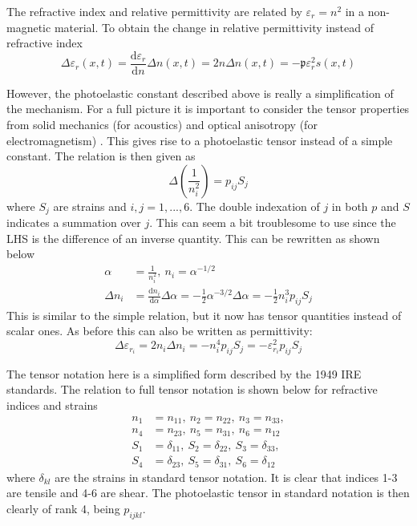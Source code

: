 \documentclass[10pt,a4paper]{eitExjobb}
\begin{document}
	The refractive index and relative permittivity are related by $\varepsilon_r = n^2$ in a non-magnetic material. To obtain the change in relative permittivity instead of refractive index
	\begin{equation*}
	\Delta \varepsilon_r(x,t) = \frac{\mathrm{d}\varepsilon_r}{\mathrm{d}n} \Delta n(x,t) = 2n \Delta n(x,t) = -\mathfrak{p} \varepsilon_r^2 s(x,t)
	\end{equation*}
	
	However, the photoelastic constant described above is really a simplification of the mechanism. For a full picture it is important to consider the tensor properties from solid mechanics (for acoustics) and optical anisotropy (for electromagnetism) \cite{Korpel1988}. This gives rise to a photoelastic tensor instead of a simple constant. The relation is then given as \cite{Korpel1988}
	\begin{equation*}
	\Delta \left( \frac{1}{n_i^2} \right) = p_{ij} S_j
	\end{equation*}
	where $S_j$ are strains and $i,j = 1,...,6$. The double indexation of $j$ in both $p$ and $S$ indicates a summation over $j$. This can seem a bit troublesome to use since the LHS is the difference of an inverse quantity. This can be rewritten as shown below
	\begin{align*}
	\alpha &= \frac{1}{n_i^2},\ n_i = \alpha^{-1/2} \\
	\Delta n_i &= \frac{\mathrm{d}n_i}{\mathrm{d}\alpha} \Delta \alpha = -\frac{1}{2} \alpha^{-3/2} \Delta \alpha = -\frac{1}{2} n_i^3 p_{ij} S_j
	\end{align*}
	This is similar to the simple relation, but it now has tensor quantities instead of scalar ones. As before this can also be written as permittivity:
	\begin{equation*}
	\Delta \varepsilon_{r_i} = 2n_i\Delta n_i = -n_i^4 p_{ij} S_j = -\varepsilon_{r_i}^2 p_{ij} S_j
	\end{equation*}
	
	The tensor notation here is a simplified form described by the 1949 IRE standards. The relation to full tensor notation is shown below for refractive indices and strains \cite{Korpel1988}
	\begin{align*}
	n_1 &= n_{11},\ n_2 = n_{22},\ n_3 = n_{33}, \\
	n_4 &= n_{23},\ n_5 = n_{31},\ n_6 = n_{12} \\
	S_1 &= \delta_{11},\ S_2 = \delta_{22},\ S_3 = \delta_{33}, \\
	S_4 &= \delta_{23},\ S_5 = \delta_{31},\ S_6 = \delta_{12}
	\end{align*}
	where $\delta_{kl}$ are the strains in standard tensor notation. It is clear that indices 1-3 are tensile and 4-6 are shear. The photoelastic tensor in standard notation is then clearly of rank 4, being $p_{ijkl}$.
	
\end{document}

